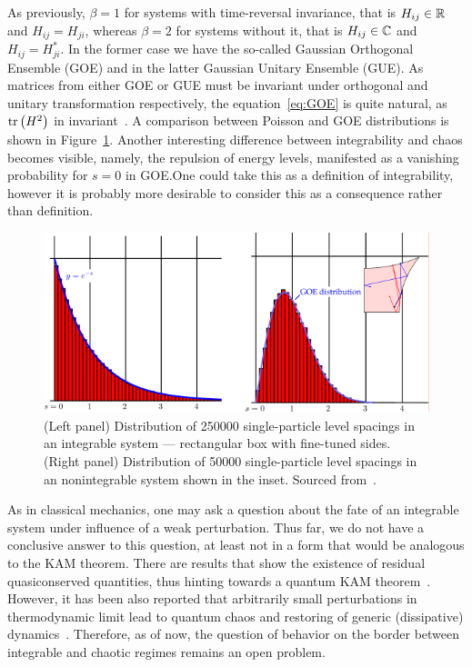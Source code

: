As previously, \(\beta = 1\) for systems with time-reversal invariance, that is
\(H_{ij}\in \mathbb{R}{}\) and \(H_{ij} = H_{ji}\), whereas \(\beta = 2\) for systems without it,
that is \(H_{ij} \in \mathbb{C}{}\) and \(H_{ij} = H_{ji}^{\ast}\). In the former case we have
the so-called Gaussian Orthogonal Ensemble (GOE) and in the latter Gaussian Unitary Ensemble (GUE).
As matrices from either GOE or GUE must be invariant under orthogonal and unitary transformation
respectively, the equation~\eqref{eq:GOE} is quite natural, as \(\tr\left(H^2\right)\) in 
invariant~\autocite{DAlessio2016}. A comparison between Poisson and GOE distributions
is shown in Figure~\ref{fig:spacing}. Another interesting difference between integrability and
chaos becomes visible, namely, the repulsion of energy levels, manifested as a vanishing probability
for \(s=0\) in GOE.\@ One could take this as a definition of integrability, however it is probably
more desirable to consider this as a consequence rather than definition.
\begin{figure}[htbp]
    \centering
    \includegraphics[width=1.0\textwidth,trim={0.03cm 0.03cm 0.03cm 0.03cm},clip]{Figures/spacing.pdf}
    \caption{(Left panel) Distribution of 250000 single-particle level spacings in an integrable system
    --- rectangular box with fine-tuned sides. (Right panel) Distribution of 50000 single-particle
    level spacings in an nonintegrable system shown in the inset. Sourced from~\autocite{DAlessio2016,Rudnick2008}.
     }\label{fig:spacing}
\end{figure}

As in classical mechanics, one may ask a question about the fate of an integrable system
under influence of a weak perturbation. Thus far, we do not have a conclusive answer to this
question, at least not in a form that would be analogous to the KAM theorem. There are results
that show the existence of residual quasiconserved quantities, thus hinting towards a
quantum KAM theorem~\autocite{Brandino2015}. However, it has been also reported that
arbitrarily small perturbations in thermodynamic limit lead to quantum chaos and restoring
of generic (dissipative) dynamics~\autocite{LeBlond2021}. Therefore, as of now, the question of behavior
on the border between integrable and chaotic regimes remains an open problem.